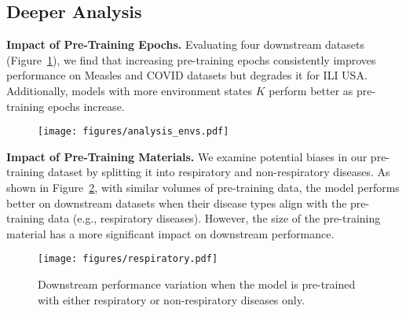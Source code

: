 


\subsection{Deeper Analysis}
\noindent\textbf{Impact of Pre-Training Epochs.} Evaluating four downstream datasets (Figure~\ref{fig:num_envs}), we find that increasing pre-training epochs consistently improves performance on Measles and COVID datasets but degrades it for ILI USA. Additionally, models with more environment states \( K \) perform better as pre-training epochs increase.
\begin{figure}
\centering
        \texttt{[image: figures/analysis\_envs.pdf]}
        \label{fig:num_envs}
\end{figure}

\noindent\textbf{Impact of Pre-Training Materials.} We examine potential biases in our pre-training dataset by splitting it into respiratory and non-respiratory diseases. As shown in Figure~\ref{fig: respiratory}, with similar volumes of pre-training data, the model performs better on downstream datasets when their disease types align with the pre-training data (e.g., respiratory diseases). However, the size of the pre-training material has a more significant impact on downstream performance.
\begin{figure}[htbp]
    \centering
    \texttt{[image: figures/respiratory.pdf]}
    \caption{Downstream performance variation when the model is pre-trained with either respiratory or non-respiratory diseases only.}
    \label{fig: respiratory}
\end{figure} 

